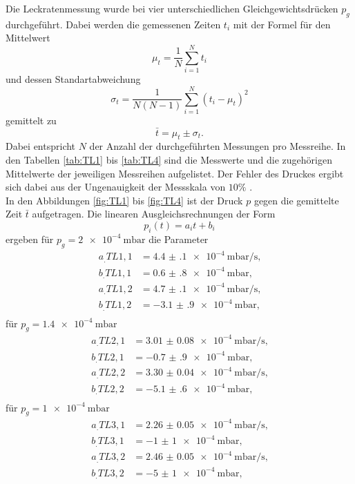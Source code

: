 Die Leckratenmessung wurde bei vier unterschiedlichen Gleichgewichtsdrücken $p_g$ durchgeführt. Dabei werden die gemessenen Zeiten $t_i$ mit der Formel für den Mittelwert
\[
\mu_t = \frac{1}{N}\sum_{i=1}^{N}t_i
\]
und dessen Standartabweichung
\[
\sigma_t = \frac{1}{N(N-1)}\sum_{i=1}^{N}(t_i-\mu_t)^2
\]
gemittelt zu
\begin{equation}
\bar{t} = \mu_t\pm \sigma_t\text{.} \label{eq:tQuer}
\end{equation} 
Dabei entspricht $N$ der Anzahl der durchgeführten Messungen pro Messreihe.
In den Tabellen \ref{tab:TL1} bis \ref{tab:TL4} sind die Messwerte und die zugehörigen Mittelwerte der jeweiligen Messreihen aufgelistet. Der Fehler des Druckes ergibt sich dabei aus der Ungenauigkeit der Messskala von $10\%$ \cite{V70}.\\
In den Abbildungen \ref{fig:TL1} bis \ref{fig:TL4} ist der Druck $p$ gegen die gemittelte Zeit $\bar{t}$ aufgetragen.
Die linearen Ausgleichsrechnungen der Form
\[
p_i(t) = a_it+b_i
\]
ergeben für $p_g = \SI{2e-4}{\milli\bar}$ die Parameter
\begin{align*}
a_.{TL1,1} &= \SI{4.4(1)e-4}{\milli\bar\per\second} \text{,}\\
b_.{TL1,1} &= \SI{0.6(8)e-4}{\milli\bar} \text{,}\\
a_.{TL1,2} &= \SI{4.7(1)e-4}{\milli\bar\per\second} \text{,}\\
b_.{TL1,2} &= \SI{-3.1(9)e-4}{\milli\bar} \text{,}\\
\end{align*}
für $p_g = \SI{1.4e-4}{\milli\bar}$
\begin{align*}
a_.{TL2,1} &= \SI{3.01(8)e-4}{\milli\bar\per\second} \text{,}\\
b_.{TL2,1} &= \SI{-0.7(9)e-4}{\milli\bar} \text{,}\\
a_.{TL2,2} &= \SI{3.30(4)e-4}{\milli\bar\per\second} \text{,}\\
b_.{TL2,2} &= \SI{-5.1(6)e-4}{\milli\bar} \text{,}\\
\end{align*}
für $p_g = \SI{1e-4}{\milli\bar}$
\begin{align*}
a_.{TL3,1} &= \SI{2.26(5)e-4}{\milli\bar\per\second} \text{,}\\
b_.{TL3,1} &= \SI{-1(1)e-4}{\milli\bar} \text{,}\\
a_.{TL3,2} &= \SI{2.46(5)e-4}{\milli\bar\per\second} \text{,}\\
b_.{TL3,2} &= \SI{-5(1)e-4}{\milli\bar} \text{,}\\
\end{align*}
